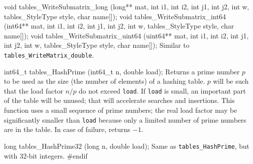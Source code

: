 void tables_WriteSubmatrix_long (long** mat, int i1, int i2, int j1, int j2, 
                                 int w, tables_StyleType style, char name[]);
void tables_WriteSubmatrix_int64 (int64** mat, int i1, int i2, int j1, int j2,
                                  int w, tables_StyleType style, char name[]);
void tables_WriteSubmatrix_uint64 (uint64** mat, int i1, int i2, int j1, int j2, 
                                   int w, tables_StyleType style, char name[]);
\endcode
 \tab Similar to {\tt tables\_WriteMatrix\_double}.
 \endtab
\code

int64_t tables_HashPrime (int64_t n, double load);
\endcode
  \tab Returns a prime number $p$ to be used as the size 
   (the number of elements) of a hashing table.
   $p$ will be such that the load factor $n/p$ do not exceed {\tt load}.
   If {\tt load} is small, an important part of the table will be unused; that
   will accelerate searches and insertions.
   This function uses a small sequence of prime numbers; the real load factor
   may be significantly smaller than {\tt load} because only a limited
   number of prime numbers are in the table. In case of failure, returns $-1$.
 \endtab
\code

long tables_HashPrime32 (long n, double load);
\endcode
  \tab Same as \texttt{tables\_HashPrime}, but with 32-bit integers.
 \endtab
\code\hide
#endif
\endhide
\endcode
